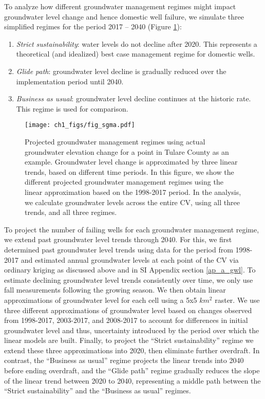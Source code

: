 To analyze how different groundwater management regimes might impact groundwater level change and hence domestic well failure, we simulate three simplified regimes for the period 2017 -- 2040 (Figure \ref{fig:SGMAscenarios}): 

\begin{enumerate}
	\item \textit{Strict sustainability}: water levels do not decline after 2020. This represents a theoretical (and idealized) best case management regime for domestic wells.  
	\item \textit{Glide path}: groundwater level decline is gradually reduced over the implementation period until 2040.  
	\item \textit{Business as usual}: groundwater level decline continues at the historic rate. This regime is used for comparison.  
\end{enumerate}


\begin{figure}%
	\centering
	\texttt{[image: ch1\_figs/fig\_sgma.pdf]}
	\caption{Projected groundwater management regimes using actual groundwater elevation change for a point in Tulare County as an example. Groundwater level change is approximated by three linear trends, based on different time periods. In this figure, we show the different projected groundwater management regimes using the linear approximation based on the 1998-2017 period. In the analysis, we calculate groundwater levels across the entire CV, using all three trends, and all three regimes.}
	\label{fig:SGMAscenarios}
\end{figure}

To project the number of failing wells for each groundwater management regime, we extend past groundwater level trends through 2040. For this, we first determined past groundwater level trends using data for the period from 1998-2017 and estimated annual groundwater levels at each point of the CV via ordinary kriging as discussed above and in SI Appendix section \ref{ap_a_gwl}. To estimate declining groundwater level trends consistently over time, we only use fall measurements following the growing season. We then obtain linear approximations of groundwater level for each cell using a 5x5 $km^2$ raster. We use three different approximations of groundwater level based on changes observed from 1998-2017, 2003-2017, and 2008-2017 to account for differences in initial groundwater level and thus, uncertainty introduced by the period over which the linear models are built. Finally, to project the ``Strict sustainability'' regime we extend these three approximations into 2020, then eliminate further overdraft. In contrast, the ``Business as usual'' regime projects the linear trends into 2040 before ending overdraft, and the ``Glide path'' regime gradually reduces the slope of the linear trend between 2020 to 2040, representing a middle path between the ``Strict sustainability'' and the ``Business as usual'' regimes. 




